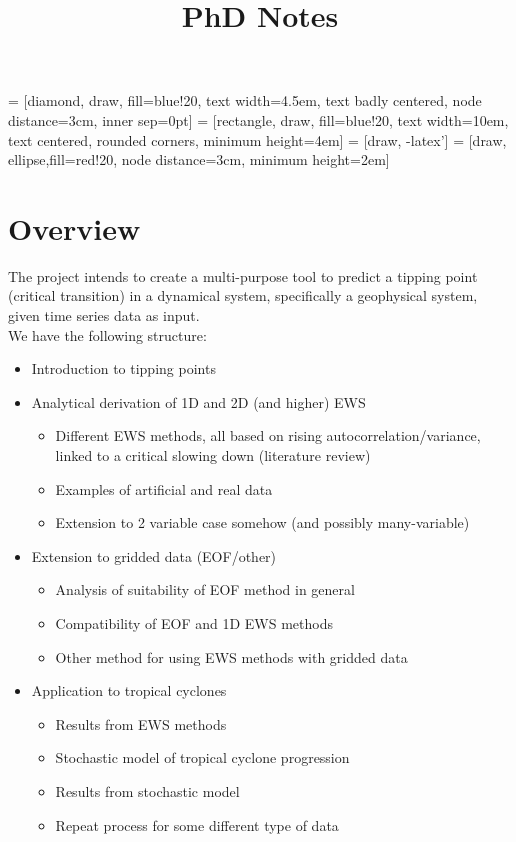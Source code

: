 \documentclass[11pt,a4paper,reqno]{article}
\numberwithin{equation}{section}
\begin{document}


\title{PhD Notes}
\maketitle

 = [diamond, draw, fill=blue!20, 
    text width=4.5em, text badly centered, node distance=3cm, inner sep=0pt]
 = [rectangle, draw, fill=blue!20, 
    text width=10em, text centered, rounded corners, minimum height=4em]
 = [draw, -latex']
 = [draw, ellipse,fill=red!20, node distance=3cm,
    minimum height=2em]
    
\section*{Overview}

The project intends to create a multi-purpose tool to predict a tipping point (critical transition) in a dynamical system, specifically a geophysical system, given time series data as input.\\

We have the following structure:
\begin{itemize}
\item[\ref{sec_tippingpoints}.] Introduction to tipping points
\item[\ref{sec_EWS_methods}.] Analytical derivation of 1D and 2D (and higher) EWS 
\begin{itemize}
\item Different EWS methods, all based on rising autocorrelation/variance, linked to a critical slowing down (literature review)
\item Examples of artificial and real data
\item Extension to 2 variable case somehow (and possibly many-variable)
\end{itemize}
\item[\ref{sec_gridded}.] Extension to gridded data (EOF/other)
\begin{itemize}
\item Analysis of suitability of EOF method in general
\item Compatibility of EOF and 1D EWS methods
\item Other method for using EWS methods with gridded data
\end{itemize}
\item[\ref{sec_hurricanes}.] Application to tropical cyclones
\begin{itemize}
\item Results from EWS methods
\item Stochastic model of tropical cyclone progression
\item Results from stochastic model
\item Repeat process for some different type of data
\end{itemize}
\end{itemize}
\end{document}
